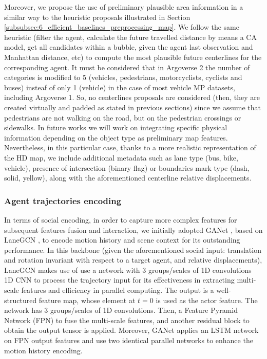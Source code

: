 Moreover, we propose the use of preliminary plausible area information in a similar way to the heuristic proposals illustrated in Section \ref{subsubsec:6_efficient_baselines_preprocessing_map}. We follow the same heuristic (filter the agent, calculate the future travelled distance by means a CA model, get all candidates within a bubble, given the agent last observation and Manhattan distance, etc) to compute the most plausible future centerlines for the corresponding agent. It must be considered that in Argoverse 2 the number of categories is modified to 5 (vehicles, pedestrians, motorcyclists, cyclists and buses) insteaf of only 1 (vehicle) in the case of most vehicle \ac{MP} datasets, including Argoverse 1. So, no centerlines proposals are considered (then, they are created virtually and padded as stated in previous sections) since we assume that pedestrians are not walking on the road, but on the pedestrian crossings or sidewalks. In future works we will work on integrating specific physical information depending on the object type as preliminary map features. Nevertheless, in this particular case, thanks to a more realistic representation of the HD map, we include additional metadata such as lane type (bus, bike, vehicle), presence of intersection (binary flag) or boundaries mark type (dash, solid, yellow), along with the aforementioned centerline relative displacements. 

\subsubsection{Agent trajectories encoding}
\label{subsubsec:7_improving_trajectories_encoding}

In terms of social encoding, in order to capture more complex features for subsequent features fusion and interaction, we initially adopted GANet \cite{wang2022ganet}, based on LaneGCN \cite{liang2020learning}, to encode motion history and scene context for its outstanding performance. In this backbone (given the aforementioned social input: translation and rotation invariant with respect to a target agent, and relative displacements), LaneGCN makes use of use a network with $3$ groups/scales of 1D convolutions 1D CNN to process the trajectory input for its effectiveness in extracting multi-scale features and efficiency in parallel computing. The output is a well-structured feature map, whose element at $t=0$ is used as the actor feature. The network has $3$ groups/scales of 1D convolutions. Then, a Feature Pyramid Network (FPN) \cite{lin2017feature} to fuse the multi-scale features, and another residual block to obtain the output tensor is applied. Moreover, GANet applies an \ac{LSTM} network on FPN output features and use two identical parallel networks to enhance the motion history encoding.


